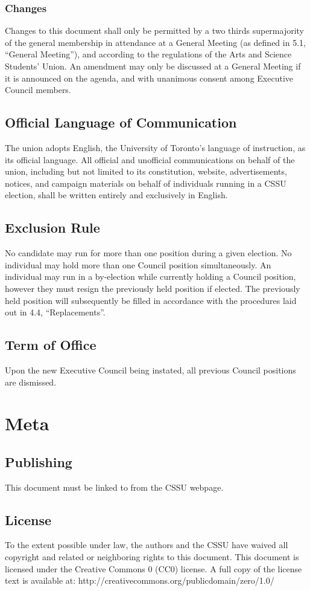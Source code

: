 \documentclass{article}
\begin{document}
\subsubsection{Changes}  \label{sec:5.2.2}
Changes to this document shall only be permitted by a two thirds supermajority of the general membership in attendance at a General Meeting (as defined in 5.1, “General Meeting”), and according to the regulations of the Arts and Science Students’ Union.
An amendment may only be discussed at a General Meeting if it is announced on the agenda, and with unanimous consent among Executive Council members.
\subsection{Official Language of Communication}  \label{sec:5.3}
The union adopts English, the University of Toronto’s language of instruction, as its official language.
All official and unofficial communications on behalf of the union, including but not limited to its constitution, website, advertisements, notices, and campaign materials on behalf of individuals running in a CSSU election, shall be written entirely and exclusively in English.
\subsection{Exclusion Rule}  \label{sec:5.4}
No candidate may run for more than one position during a given election. No individual may hold more than one Council position simultaneously. An individual may run in a by-election while currently holding a Council position, however they must resign the previously held position if elected. The previously held position will subsequently be filled in accordance with the procedures laid out in 4.4, “Replacements”.
\subsection{Term of Office}  \label{sec:5.5}
Upon the new Executive Council being instated, all previous Council positions are dismissed.

\section{Meta} \label{sec:6}
\subsection{Publishing}  \label{sec:6.1}
This document must be linked to from the CSSU webpage.
\subsection{License}  \label{sec:6.2}
To the extent possible under law, the authors and the CSSU have waived all copyright and related or neighboring rights to this document.
This document is licensed under the Creative Commons 0 (CC0) license. A full copy of the license text is available at: http://creativecommons.org/publicdomain/zero/1.0/
\end{document}
